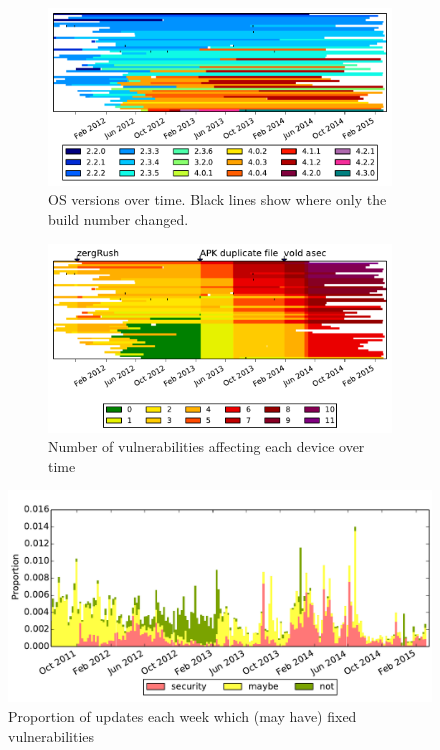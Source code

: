 \documentclass{llncs}
\newcommand{\da}{Device Analyzer}
\begin{document}
{\begin{figure}[p]
 \centering
 \begin{subfigure}[b]{\columnwidth}
  \includegraphics[width=\columnwidth]{figures/device-data-all-os}
  \caption{OS versions over time. Black lines show where only the build number changed.}
  \label{fig:device_data_os}
 \end{subfigure}
 \begin{subfigure}[b]{\columnwidth}
  \includegraphics[width=\columnwidth]{figures/device-data-all-security}
  \caption{Number of vulnerabilities affecting each device over time}
  \label{fig:device_data_security}
 \end{subfigure}
 \caption{The top \daNumDeviceDataDevices\ devices by days of contribution in the \da\ data. One strip per device handset.}
  \includegraphics[width=\columnwidth]{figures/nw_security_updates.pdf}
 \caption{Proportion of updates each week which (may have) fixed vulnerabilities}
 \label{fig:weekly_security_updates}
\end{figure}}
\end{document}
